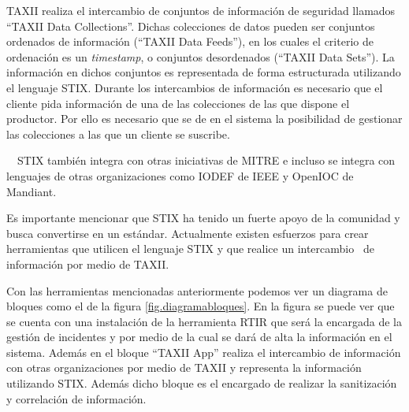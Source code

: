 \bigskip

	TAXII realiza el intercambio de conjuntos de información de seguridad llamados ``TAXII Data Collections''. Dichas
	colecciones de datos pueden ser conjuntos ordenados de información (``TAXII Data Feeds''), en los cuales el criterio de
	ordenación es un \textit{timestamp}, o conjuntos desordenados (``TAXII Data Sets''). La información en dichos conjuntos
	es representada de forma estructurada utilizando el lenguaje STIX. Durante los intercambios de información es necesario
	que el cliente pida información de una de las colecciones de las que dispone el productor. Por ello es necesario que se
	de en el sistema la posibilidad de gestionar las colecciones a las que un cliente se suscribe.


\bigskip

	\ \ STIX también integra con otras iniciativas de MITRE e incluso se integra con lenguajes de otras organizaciones como
	IODEF de IEEE y OpenIOC de Mandiant.


\bigskip

	Es importante mencionar que STIX ha tenido un fuerte apoyo de la comunidad y busca convertirse en un estándar. Actualmente
	existen esfuerzos para crear herramientas que utilicen el lenguaje STIX y que realice un intercambio \ de información
	por medio de TAXII.

\bigskip

	Con las herramientas mencionadas anteriormente podemos ver un diagrama de bloques como el de la figura \ref{fig.diagramabloques}. En la figura
	se puede ver que se cuenta con una instalación de la herramienta RTIR que será la encargada de la gestión de incidentes
	y por medio de la cual se dará de alta la información en el sistema. Además en el bloque ``TAXII App'' realiza el
	intercambio de información con otras organizaciones por medio de TAXII y representa la información utilizando STIX.
	Además dicho bloque es el encargado de realizar la sanitización y correlación de información.

